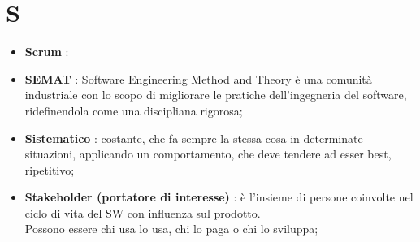 % 
%
% 
%

\section{S}

\begin{itemize}
	\item \textbf{Scrum} : 

	\item \textbf{SEMAT} : Software Engineering Method and Theory è una comunità industriale con lo scopo di migliorare le pratiche dell'ingegneria del software, ridefinendola come una discipliana rigorosa;

	\item \textbf{Sistematico} : costante, che fa sempre la stessa cosa in determinate situazioni, applicando un comportamento, che deve tendere ad esser best, ripetitivo;

	\item \textbf{Stakeholder (portatore di interesse)} : è l'insieme di persone coinvolte nel ciclo di vita del SW con influenza sul prodotto. \\
Possono essere chi usa lo usa, chi lo paga o chi lo sviluppa;

\end{itemize}